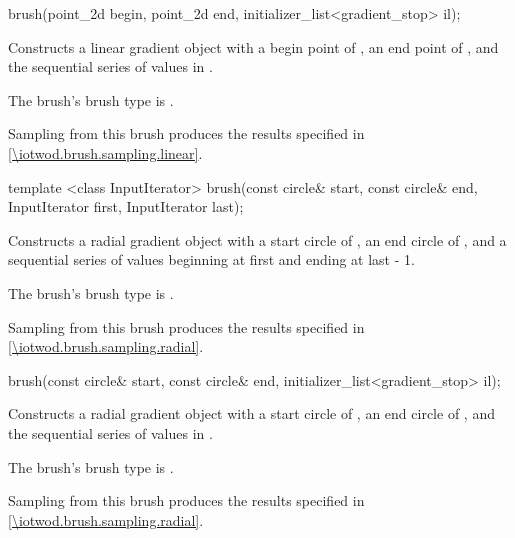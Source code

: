 %
\begin{itemdecl}
brush(point_2d begin, point_2d end,
  initializer_list<gradient_stop> il);
\end{itemdecl}
\begin{itemdescr}
\pnum
\effects
Constructs a linear gradient  object with a begin point of , an end point of , and the sequential series of  values in .

\pnum
The brush's brush type is .

\pnum
\remarks
Sampling from this brush produces the results specified in \ref{\iotwod.brush.sampling.linear}.
\end{itemdescr}

%
\begin{itemdecl}
template <class InputIterator>
brush(const circle& start, const circle& end,
  InputIterator first, InputIterator last);
\end{itemdecl}
\begin{itemdescr}
\pnum
\effects
Constructs a radial gradient  object with a start circle of , an end circle of ,  and a sequential series of  values beginning at {first} and ending at {last - 1}.

\pnum
The brush's brush type is .

\pnum
\remarks
Sampling from this brush produces the results specified in \ref{\iotwod.brush.sampling.radial}.
\end{itemdescr}

%
\begin{itemdecl}
brush(const circle& start, const circle& end,
  initializer_list<gradient_stop> il);
\end{itemdecl}
\begin{itemdescr}
\pnum
\effects
Constructs a radial gradient  object with a start circle of , an end circle of , and the sequential series of  values in .

\pnum
The brush's brush type is .

\pnum
\remarks
Sampling from this brush produces the results specified in \ref{\iotwod.brush.sampling.radial}.
\end{itemdescr}

